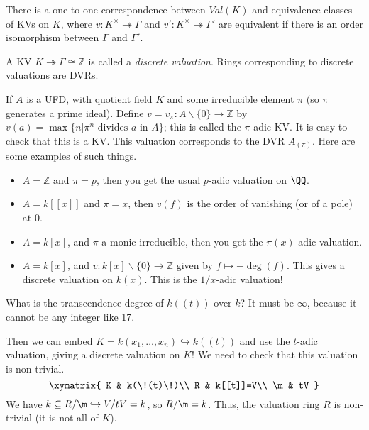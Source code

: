  \begin{corollary}
   There is a one to one correspondence between $Val(K)$ and equivalence classes of KVs
   on $K$, where $v:K^\times\twoheadrightarrow \Gamma$ and $v':K^\times\twoheadrightarrow
   \Gamma'$ are equivalent if there is an order isomorphism between $\Gamma$ and
   $\Gamma'$.
 \end{corollary}
 \begin{definition}
   A KV $K\twoheadrightarrow \Gamma\cong \mathbb{Z}$ is called a \emph{discrete valuation}.
   Rings corresponding to discrete valuations are DVRs.
 \end{definition}
 \begin{example}
   If $A$ is a UFD, with quotient field $K$ and some irreducible element $\pi$ (so $\pi$
   generates a prime ideal). Define $v=v_\pi:A\smallsetminus\{0\}\to \mathbb{Z}$ by
   $v(a)=\max\{n|\pi^n\text{ divides } a \text{ in } A\}$; this is called the $\pi$-adic
   KV. It is easy to check that this is a KV. This valuation corresponds to the DVR
   $A_{(\pi)}$. Here are some examples of such things.
   \begin{itemize}
     \item $A=\mathbb{Z}$ and $\pi=p$, then you get the usual $p$-adic valuation on $\QQ$.
     \item $A=k[[x]]$ and $\pi=x$, then $v(f)$ is the order of vanishing (or of a pole) at
     0.
     \item $A=k[x]$, and $\pi$ a monic irreducible, then you get the $\pi(x)$-adic
     valuation.
     \item $A=k[x]$, and $v:k[x]\smallsetminus\{0\}\to \mathbb{Z}$ given by $f\mapsto -\deg(f)$.
     This gives a discrete valuation on $k(x)$. This is the $1/x$-adic valuation!
   \end{itemize}
 \end{example}
 \begin{example}
   What is the transcendence degree of $k(\!(t)\!)$ over $k$? It must be $\infty$,
   because it cannot be any integer like 17.

   Then we can embed $K=k(x_1,\dots, x_n)\hookrightarrow k(\!(t)\!)$ and use the $t$-adic
   valuation, giving a discrete valuation on $K$! We need to check that this valuation is
   non-trivial.
   \[\xymatrix{
    K & k(\!(t)\!)\\
    R & k[[t]]=V\\
    \m & tV
   }\]
   We have $k\subseteq R/\m\hookrightarrow V/tV=k$, so $R/\m=k$. Thus, the valuation ring
   $R$ is non-trivial (it is not all of $K$).
 \end{example}

